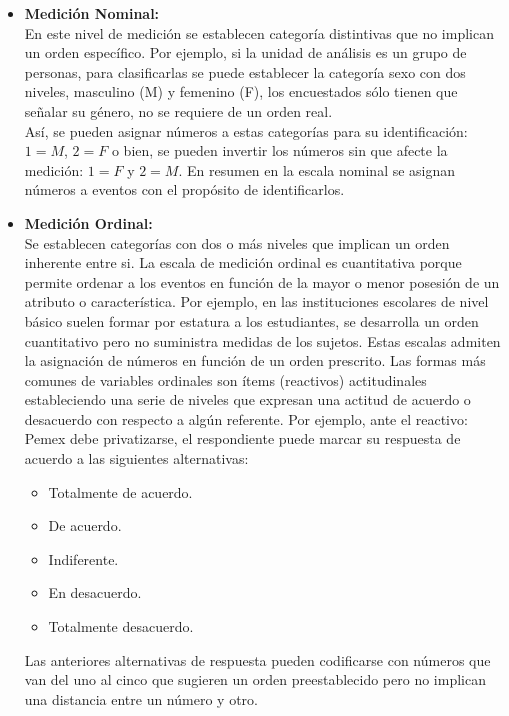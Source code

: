 \documentclass[12pt,hidelinks]{article}
\begin{document}
	\begin{itemize}
		\item \textbf{Medición Nominal:}\\
		\vspace{2mm}
		En este nivel de medición se establecen categoría distintivas que no implican un orden específico. Por ejemplo, si la unidad de análisis es un grupo de personas, para clasificarlas se puede establecer la categoría sexo con dos niveles, masculino (M) y femenino (F), los encuestados sólo tienen que señalar su género, no se requiere de un orden real.\\
		\vspace{2mm}
		Así, se pueden asignar números a estas categorías para su identificación: $1=M$, $2=F$ o bien, se pueden invertir los números sin que afecte la medición: $1=F$ y $2=M$. En resumen en la escala nominal se asignan números a eventos con el propósito de identificarlos.
		\item  \textbf{Medición Ordinal:}\\ 
		\vspace{2mm}
		Se establecen categorías con dos o más niveles que implican un orden inherente entre si. La escala de medición ordinal es cuantitativa porque permite ordenar a los eventos en función de la mayor o menor  posesión de un atributo o característica. Por ejemplo, en las instituciones escolares de nivel básico suelen formar por estatura a los estudiantes, se desarrolla un orden cuantitativo pero no suministra medidas de los sujetos. Estas escalas admiten la asignación de números en función de un orden prescrito. Las formas más comunes de variables ordinales son ítems (reactivos) actitudinales estableciendo una serie de niveles que expresan una actitud de acuerdo o desacuerdo con respecto a algún referente. Por ejemplo, ante el reactivo: Pemex debe privatizarse, el respondiente puede marcar su
		respuesta de acuerdo a las siguientes alternativas:
		\begin{itemize}
			\item Totalmente de acuerdo.
			\item De acuerdo.
			\item Indiferente.
			\item En desacuerdo.
			\item Totalmente desacuerdo.
		\end{itemize}
		Las anteriores alternativas de respuesta pueden codificarse con números que van del uno al cinco que sugieren un orden preestablecido pero no implican una distancia entre un número y otro.

\end{itemize}
\end{document}
